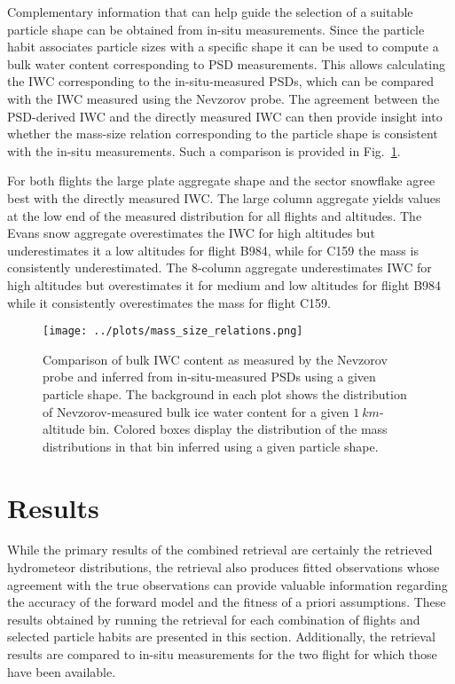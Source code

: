 \documentclass[journal abbreviation, manuscript]{copernicus}
\begin{document}
Complementary information that can help guide the selection of a suitable
particle shape can be obtained from in-situ measurements. Since the particle
habit associates particle sizes with a specific shape it can be used to compute
a bulk water content corresponding to PSD measurements. This allows calculating
the IWC corresponding to the in-situ-measured PSDs, which can be compared with
the IWC measured using the Nevzorov probe. The agreement between the PSD-derived
IWC and the directly measured IWC can then provide insight into whether the
mass-size relation corresponding to the particle shape is consistent with the
in-situ measurements. Such a comparison is provided in
Fig.~\ref{fig:mass_size_relation}.

For both flights the large plate aggregate shape and the sector snowflake agree
best with the directly measured IWC. The large column aggregate yields values at
the low end of the measured distribution for all flights and altitudes. The
Evans snow aggregate overestimates the IWC for high altitudes but underestimates
it a low altitudes for flight B984, while for C159 the mass is consistently
underestimated. The 8-column aggregate underestimates IWC for high altitudes but
overestimates it for medium and low altitudes for flight B984 while it
consistently overestimates the mass for flight C159.

\begin{figure}
  \centering
  \texttt{[image: ../plots/mass\_size\_relations.png]}
  \caption{
    Comparison of bulk IWC content as measured by the Nevzorov probe and
    inferred from in-situ-measured PSDs using a given particle shape. The
    background in each plot shows the distribution of Nevzorov-measured bulk
    ice water content for a given $1\ \unit{km}$-altitude bin. Colored boxes
    display the distribution of the mass distributions in that bin inferred
    using a given particle shape.
    }
  \label{fig:mass_size_relation}
\end{figure}


\section{Results}
\label{sec:results}

While the primary results of the combined retrieval are certainly the retrieved
hydrometeor distributions, the retrieval also produces fitted observations whose
agreement with the true observations can provide valuable information regarding
the accuracy of the forward model and the fitness of a priori assumptions. These
results obtained by running the retrieval for each combination of flights and
selected particle habits are presented in this section. Additionally, the
retrieval results are compared to in-situ measurements for the two flight for
which those have been available.
\end{document}
